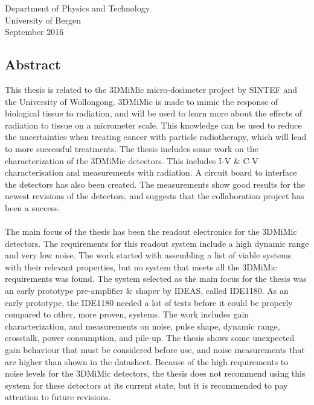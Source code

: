 \documentclass[12pt, a4paper]{report}
\begin{document}
\begin{titlepage}
\begin{center}
{	\large {Department of Physics and Technology}\\
	\large {University of Bergen}\\[1cm]
	September 2016}
\end{center}
\end{titlepage}

\blankpage	%


\clearpage	%
\begin{center}
\begin{minipage}{\textwidth}
\chapter*{Abstract} %
This thesis is related to the 3DMiMic micro-dosimeter project by SINTEF and the University of Wollongong. 3DMiMic is made to mimic the response of biological tissue to radiation, and will be used to learn more about the effects of radiation to tissue on a micrometer scale. This knowledge can be used to reduce the uncertainties when treating cancer with particle radiotherapy, which will lead to more successful treatments. The thesis includes some work on the characterization of the 3DMiMic detectors. This includes I-V \& C-V characterisation and measurements with radiation. A circuit board to interface the detectors has also been created. The measurements show good results for the newest revisions of the detectors, and suggests that the collaboration project has been a success.
\\ \\
The main focus of the thesis has been the readout electronics for the 3DMiMic detectors. The requirements for this readout system include a high dynamic range and very low noise. The work started with assembling a list of viable systems with their relevant properties, but no system that meets all the 3DMiMic requirements was found. The system selected as the main focus for the thesis was an early prototype pre-amplifier \& shaper by IDEAS, called IDE1180. As an early prototype, the IDE1180 needed a lot of tests before it could be properly compared to other, more proven, systems. The work includes gain characterization, and measurements on noise, pulse shape, dynamic range, crosstalk, power consumption, and pile-up. The thesis shows some unexpected gain behaviour that must be considered before use, and noise measurements that are higher than shown in the datasheet. Because of the high requirements to noise levels for the 3DMiMic detectors, the thesis does not recommend using this system for these detectors at its current state, but it is recommended to pay attention to future revisions. 


\end{minipage}
\end{center}
\clearpage
\end{document}
